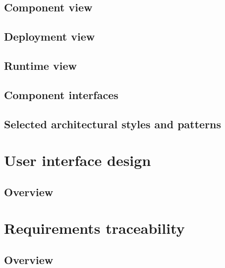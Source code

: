 \documentclass[10pt,english, openany]{book}
\begin{document}


\section{Component view}



\section{Deployment view}



\section{Runtime view}



\section{Component interfaces}



\section{Selected architectural styles and patterns}



\chapter{User interface design}

\section{Overview}



\chapter{Requirements traceability}

\section{Overview}
\end{document}
